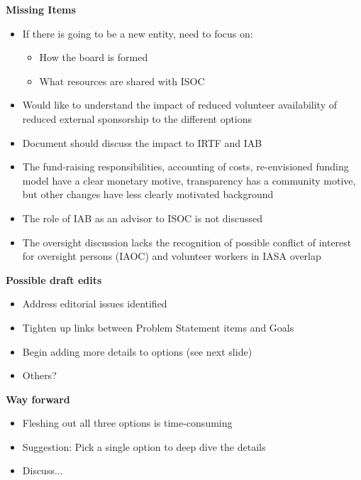 \documentclass[helvetica,landscape]{seminar}
\newcommand{\heading}[1]{%
  \begin{center} 
    \large\bf 
    #1 
  \end{center} 
  \vspace{.4 in}}
\begin{document}
\begin{slide}
\heading{Missing Items}
{\footnotesize
\begin{itemize}
\item If there is going to be a new entity, need to focus on:
\begin{itemize}
\item How the board is formed
\item What resources are shared with ISOC
\end{itemize}

\item Would like to understand the impact of reduced volunteer availability of reduced external sponsorship to the different options
\item Document should discuss the impact to IRTF and IAB
\item The fund-raising responsibilities, accounting of costs, re-envisioned funding model have a clear monetary motive, transparency has a community motive, but other changes have less clearly motivated background
\item The role of IAB as an advisor to ISOC is not discussed
\item The oversight discussion lacks the recognition of possible conflict of interest for oversight persons (IAOC) and volunteer workers in IASA overlap
\end{itemize}
}
\end{slide}

\begin{slide}

\heading{Possible draft edits}
\begin{itemize}
\item Address editorial issues identified
\item Tighten up links between Problem Statement items and Goals
\item Begin adding more details to options (see next slide)
\item Others?
\end{itemize}
\end{slide}

\begin{slide}

\heading{Way forward}

\begin{itemize}
\item Fleshing out all three options is time-consuming
\item Suggestion: Pick a single option to deep dive the details
\item Discuss...
\end{itemize}

\end{slide}
\end{document}
